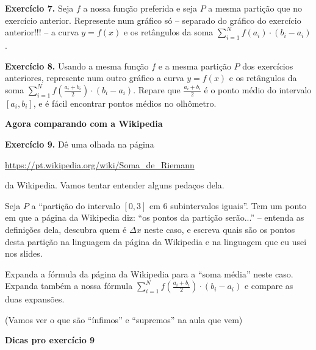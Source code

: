 \documentclass[oneside,12pt]{article}
\begin{document}
\msk

{\bf Exercício 7.} Seja $f$ a nossa função preferida e seja $P$ a
mesma partição que no exercício anterior. Represente num gráfico só --
separado do gráfico do exercício anterior!!! -- a curva $y=f(x)$ e os
retângulos da soma $\sum_{i=1}^N f(a_i)·(b_i-a_i)$.

\msk

{\bf Exercício 8.} Usando a mesma função $f$ e a mesma partição $P$
dos exercícios anteriores, represente num outro gráfico a curva
$y=f(x)$ e os retângulos da soma $\sum_{i=1}^N
f(\frac{a_i+b_i}{2})·(b_i-a_i)$. Repare que $\frac{a_i+b_i}{2}$ é o
ponto médio do intervalo $[a_i,b_i]$, e é fácil encontrar pontos
médios no olhômetro.

\newpage


{\bf Agora comparando com a Wikipedia}

\msk

{\bf Exercício 9.} Dê uma olhada na página

\ssk

\url{https://pt.wikipedia.org/wiki/Soma_de_Riemann}

\ssk

da Wikipedia. Vamos tentar entender alguns pedaços dela.

Seja $P$ a ``partição do intervalo $[0,3]$ em 6 subintervalos
iguais''. Tem um ponto em que a página da Wikipedia diz: ``os pontos
da partição serão...'' -- entenda as definições dela, descubra quem é
$Δx$ neste caso, e escreva quais são os pontos desta partição na
linguagem da página da Wikipedia e na linguagem que eu usei nos slides.

Expanda a fórmula da página da Wikipedia para a ``soma média'' neste
caso. Expanda também a nossa fórmula $\sum_{i=1}^N
f(\frac{a_i+b_i}{2})·(b_i-a_i)$ e compare as duas expansões.

\msk

(Vamos ver o que são ``ínfimos'' e ``supremos'' na aula que vem)

\newpage


{\bf Dicas pro exercício 9}
\end{document}
